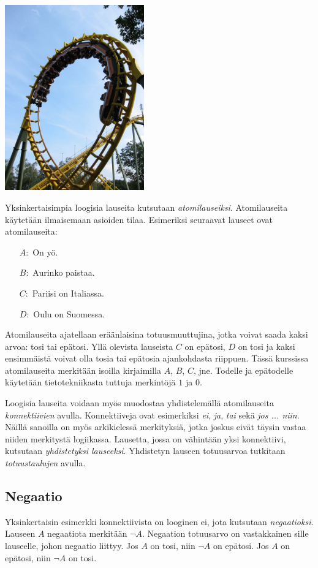 \bigskip

\begin{center}
\includegraphics[width=6cm]{pictures/kuvitus/Rollercoaster} %
\end{center}

\bigskip

Yksinkertaisimpia loogisia lauseita kutsutaan {\em atomilauseiksi}. Atomilauseita käytetään ilmaisemaan asioiden tilaa. Esimeriksi seuraavat lauseet ovat atomilauseita:
\begin{itemize}
\item[$A:$] On yö.
\item[$B:$] Aurinko paistaa.
\item[$C:$] Pariisi on Italiassa.
\item[$D:$] Oulu on Suomessa.
\end{itemize}
Atomilauseita ajatellaan eräänlaisina totuusmuuttujina, jotka voivat saada kaksi arvoa: tosi tai epätosi. Yllä olevista lauseista $C$ on epätosi, $D$ on tosi ja kaksi ensimmäistä voivat olla tosia tai epätosia ajankohdasta riippuen. Tässä kurssissa atomilauseita merkitään isoilla kirjaimilla $A$, $B$, $C$, jne. Todelle ja epätodelle käytetään tietotekniikasta tuttuja merkintöjä $1$ ja $0$.

Loogisia lauseita voidaan myös muodostaa yhdistelemällä atomilauseita {\em konnektiivien} avulla. Konnektiiveja ovat esimerkiksi \emph{ei}, \emph{ja}, \emph{tai} sekä \emph{jos ... niin}. Näillä sanoilla on myös arkikielessä merkityksiä, jotka joskus eivät täysin vastaa niiden merkitystä logiikassa. Lausetta, jossa on vähintään yksi konnektiivi, kutsutaan {\em yhdistetyksi lauseeksi}. Yhdistetyn lauseen totuusarvoa tutkitaan \emph{totuustaulujen} avulla.

\subsection*{Negaatio} Yksinkertaisin esimerkki konnektiivista on looginen ei, jota kutsutaan {\em negaatioksi}. Lauseen $A$ negaatiota merkitään $\lnot A$. Negaation totuusarvo on vastakkainen sille lauseelle, johon negaatio liittyy. Jos $A$ on tosi, niin $\lnot A$ on epätosi. Jos $A$ on epätosi, niin $\lnot A$ on tosi.

